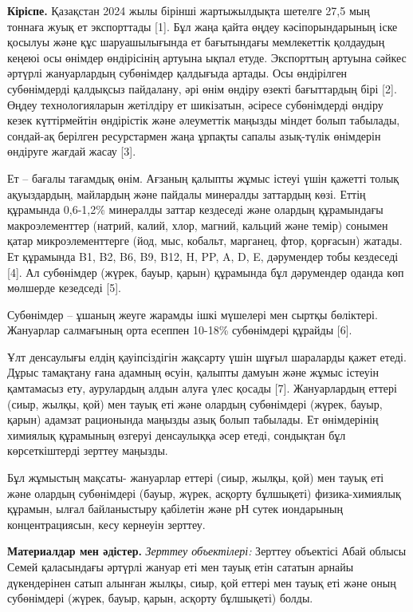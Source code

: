 \begin{multicols}{2}
{\bfseries Кіріспе.} Қазақстан 2024 жылы бірінші жартыжылдықта шетелге 27,5
мың тоннаға жуық ет экспорттады {[}1{]}. Бұл жаңа қайта өңдеу
кәсіпорындарының іске қосылуы және құс шаруашылығында ет бағытындағы
мемлекеттік қолдаудың кеңеюі осы өнімдер өндірісінің артуына ықпал
етуде. Экспорттың артуына сәйкес әртүрлі жануарлардың субөнімдер
қалдығыда артады. Осы өндірілген субөнімдерді қалдықсыз пайдалану, әрі
өнім өндіру өзекті бағыттардың бірі {[}2{]}. Өңдеу технологияларын
жетілдіру ет шикізатын, әсіресе субөнімдерді өндіру кезек күттірмейтін
өндірістік және әлеуметтік маңызды міндет болып табылады, сондай-ақ
берілген ресурстармен жаңа ұрпақты сапалы азық-түлік өнімдерін өндіруге
жағдай жасау {[}3{]}.

Ет -- бағалы тағамдық өнім. Ағзаның қалыпты жұмыс істеуі үшін қажетті
толық ақуыздардың, майлардың және пайдалы минералды заттардың көзі.
Еттің құрамында 0,6-1,2\% минералды заттар кездеседі және олардың
құрамындағы макроэлементтер (натрий, калий, хлор, магний, кальций және
темір) сонымен қатар микроэлементтерге (йод, мыс, кобальт, марганец,
фтор, қорғасын) жатады. Ет құрамында B1, B2, B6, B9, B12, H, PP, A, D,
E, дәрумендер тобы кездеседі {[}4{]}. Ал субөнімдер (жүрек, бауыр,
қарын) құрамында бұл дәрумендер оданда көп мөлшерде кезедседі {[}5{]}.

Субөнімдер -- ұшаның жеуге жарамды ішкі мүшелері мен сыртқы бөліктері.
Жануарлар салмағының орта есеппен 10-18\% субөнімдері құрайды {[}6{]}.

Ұлт денсаулығы елдің қауіпсіздігін жақсарту үшін шұғыл шараларды қажет
етеді. Дұрыс тамақтану ғана адамның өсуін, қалыпты дамуын және жұмыс
істеуін қамтамасыз ету, аурулардың алдын алуға үлес қосады {[}7{]}.
Жануарлардың еттері (сиыр, жылқы, қой) мен тауық еті және олардың
субөнімдері (жүрек, бауыр, қарын) адамзат рационында маңызды азық болып
табылады. Ет өнімдерінің химиялық құрамының өзгеруі денсаулыққа әсер
етеді, сондықтан бұл көрсеткіштерді зерттеу маңызды.

Бұл жұмыстың мақсаты- жануарлар еттері (сиыр, жылқы, қой) мен тауық еті
және олардың субөнімдері (бауыр, жүрек, асқорту бұлшықеті)
физика-химиялық құрамын, ылғал байланыстыру қабілетін және рН сутек
иондарының концентрациясын, кесу кернеуін зерттеу.

{\bfseries Материалдар мен әдістер.} \emph{Зерттеу объектілері:} Зерттеу
объектісі Абай облысы Семей қаласындағы әртүрлі жануар еті мен тауық
етін сататын арнайы дүкендерінен сатып алынған жылқы, сиыр, қой еттері
мен тауық еті және оның субөнімдері (жүрек, бауыр, қарын, асқорту
бұлшықеті) болды.


\end{multicols}
